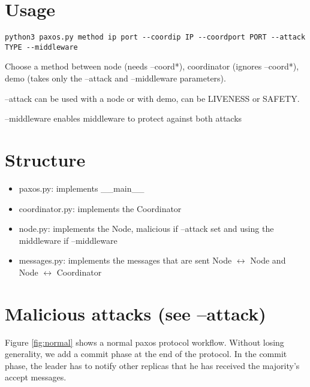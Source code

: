 \documentclass[12pt]{article}
\begin{document}
\section{Usage}

\begin{verbatim}
python3 paxos.py method ip port --coordip IP --coordport PORT --attack TYPE --middleware
\end{verbatim}

Choose a method between node (needs \textsf{--coord*}), coordinator (ignores \textsf{--coord*}), demo (takes only the \textsf{--attack} and \textsf{--middleware parameters}).

\textsf{--attack} can be used with a node or with demo, can be LIVENESS or SAFETY.

\textsf{--middleware} enables middleware to protect against both attacks


\section{Structure}

\begin{itemize}
    \item \textsf{paxos.py}: implements \textsf{\_\_main\_\_}
    \item \textsf{coordinator.py}: implements the Coordinator
    \item \textsf{node.py}: implements the Node, malicious if --attack set and using the middleware if \textsf{--middleware}
    \item \textsf{messages.py}: implements the messages that are sent Node $\leftrightarrow$ Node and Node $\leftrightarrow$ Coordinator
\end{itemize}


\section{Malicious attacks (see --attack)}

Figure \ref{fig:normal} shows a normal paxos protocol workflow. Without losing generality, we add a commit phase at the end of the protocol. In the commit phase, the leader has to notify other replicas that he has received the majority's accept messages.
\end{document}
